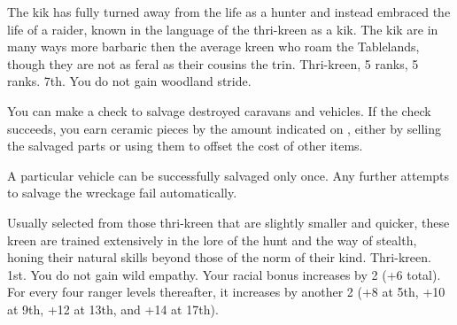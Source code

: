{The kik has fully turned away from the life as a hunter and instead embraced the life of a raider, known in the language of the thri-kreen as a kik. The kik are in many ways more barbaric then the average kreen who roam the Tablelands, though they are not as feral as their cousins the trin.}
{Thri-kreen,  5 ranks,  5 ranks.}
{7th.}
{You do not gain woodland stride.}
{
	You can make a  check to salvage destroyed caravans and vehicles. If the check succeeds, you earn ceramic pieces by the amount indicated on , either by selling the salvaged parts or using them to offset the cost of other items.

	A particular vehicle can be successfully salvaged only once. Any further attempts to salvage the wreckage fail automatically.

}
{Usually selected from those thri-kreen that are slightly smaller and quicker, these kreen are trained extensively in the lore of the hunt and the way of stealth, honing their natural skills beyond those of the norm of their kind.}
{Thri-kreen.}
{1st.}
{You do not gain wild empathy.}
{
	Your racial  bonus increases by 2 (+6 total). For every four ranger levels thereafter, it increases by another 2 (+8 at 5th, +10 at 9th, +12 at 13th, and +14 at 17th).
}

